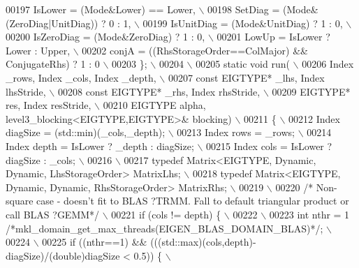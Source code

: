 \begin{DoxyCode}
00197 \textcolor{preprocessor}{    IsLower = (Mode&Lower) == Lower, \(\backslash\)}
00198 \textcolor{preprocessor}{    SetDiag = (Mode&(ZeroDiag|UnitDiag)) ? 0 : 1, \(\backslash\)}
00199 \textcolor{preprocessor}{    IsUnitDiag  = (Mode&UnitDiag) ? 1 : 0, \(\backslash\)}
00200 \textcolor{preprocessor}{    IsZeroDiag  = (Mode&ZeroDiag) ? 1 : 0, \(\backslash\)}
00201 \textcolor{preprocessor}{    LowUp = IsLower ? Lower : Upper, \(\backslash\)}
00202 \textcolor{preprocessor}{    conjA = ((RhsStorageOrder==ColMajor) && ConjugateRhs) ? 1 : 0 \(\backslash\)}
00203 \textcolor{preprocessor}{  \}; \(\backslash\)}
00204 \textcolor{preprocessor}{\(\backslash\)}
00205 \textcolor{preprocessor}{  static void run( \(\backslash\)}
00206 \textcolor{preprocessor}{    Index \_rows, Index \_cols, Index \_depth, \(\backslash\)}
00207 \textcolor{preprocessor}{    const EIGTYPE* \_lhs, Index lhsStride, \(\backslash\)}
00208 \textcolor{preprocessor}{    const EIGTYPE* \_rhs, Index rhsStride, \(\backslash\)}
00209 \textcolor{preprocessor}{    EIGTYPE* res,        Index resStride, \(\backslash\)}
00210 \textcolor{preprocessor}{    EIGTYPE alpha, level3\_blocking<EIGTYPE,EIGTYPE>& blocking) \(\backslash\)}
00211 \textcolor{preprocessor}{  \{ \(\backslash\)}
00212 \textcolor{preprocessor}{   Index diagSize  = (std::min)(\_cols,\_depth); \(\backslash\)}
00213 \textcolor{preprocessor}{   Index rows      = \_rows; \(\backslash\)}
00214 \textcolor{preprocessor}{   Index depth     = IsLower ? \_depth : diagSize; \(\backslash\)}
00215 \textcolor{preprocessor}{   Index cols      = IsLower ? diagSize : \_cols; \(\backslash\)}
00216 \textcolor{preprocessor}{\(\backslash\)}
00217 \textcolor{preprocessor}{   typedef Matrix<EIGTYPE, Dynamic, Dynamic, LhsStorageOrder> MatrixLhs; \(\backslash\)}
00218 \textcolor{preprocessor}{   typedef Matrix<EIGTYPE, Dynamic, Dynamic, RhsStorageOrder> MatrixRhs; \(\backslash\)}
00219 \textcolor{preprocessor}{\(\backslash\)}
00220 \textcolor{preprocessor}{}\textcolor{comment}{/* Non-square case - doesn't fit to BLAS ?TRMM. Fall to default triangular product or call BLAS ?GEMM*/}\textcolor{preprocessor}{ \(\backslash\)}
00221 \textcolor{preprocessor}{   if (cols != depth) \{ \(\backslash\)}
00222 \textcolor{preprocessor}{\(\backslash\)}
00223 \textcolor{preprocessor}{     int nthr = 1 }\textcolor{comment}{/*mkl\_domain\_get\_max\_threads(EIGEN\_BLAS\_DOMAIN\_BLAS)*/}\textcolor{preprocessor}{; \(\backslash\)}
00224 \textcolor{preprocessor}{\(\backslash\)}
00225 \textcolor{preprocessor}{     if ((nthr==1) && (((std::max)(cols,depth)-diagSize)/(double)diagSize < 0.5)) \{ \(\backslash\)}

\end{DoxyCode}

